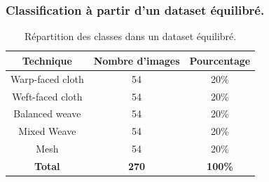 \subsubsection{Classification à partir d'un dataset équilibré.}

\begin{table}[!h]
    \centering
    \begin{tabular}{|c|c|c|}
        \hline
         \cellcolor{blue!20}\textbf{Technique} & \cellcolor{blue!20}\textbf{Nombre d'images}& \cellcolor{blue!20} \textbf{Pourcentage} \\ \hline \hline
         Warp-faced cloth & 54 & 20\% \\ \hline
         Weft-faced cloth & 54  &20\% \\ \hline
         Balanced weave & 54 & 20\% \\ \hline
         Mixed Weave & 54 &  20\% \\ \hline
         Mesh & 54 & 20\% \\ \hline
         \textbf{Total} & \textbf{270} &  \textbf{100\%}  \\ \hline
    \end{tabular}
    \caption{Répartition des classes dans un dataset équilibré.}
    \label{tab:classes_eq}
\end{table}

